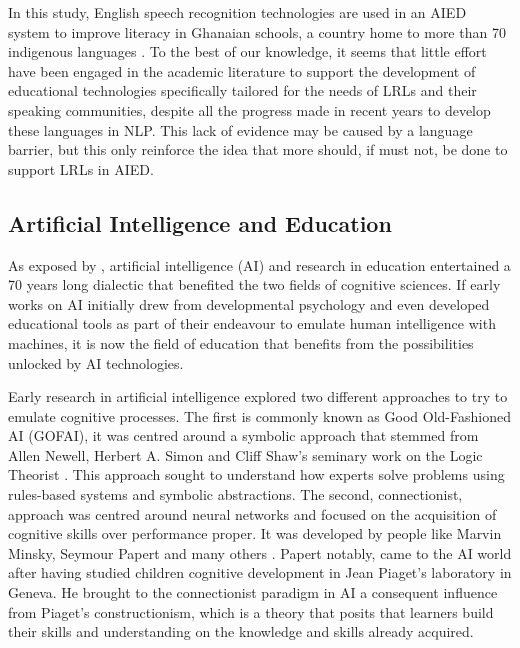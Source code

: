 In this study, English speech recognition technologies are used in an AIED system to improve literacy in Ghanaian schools, a country home to more than 70 indigenous languages \parencite{noauthor_ghana_nodate}.
To the best of our knowledge, it seems that little effort have been engaged in the academic literature to support the development of educational technologies specifically tailored for the needs of LRLs and their speaking communities, despite all the progress made in recent years to develop these languages in NLP. This lack of evidence may be caused by a language barrier, but this only reinforce the idea that more should, if must not, be done to support LRLs in AIED.

    \subsection{Artificial Intelligence and Education}
As exposed by \textcite{doroudi_intertwined_2023}, artificial intelligence (AI) and research in education entertained a 70 years long dialectic that benefited the two fields of cognitive sciences. If early works on AI initially drew from developmental psychology and even developed educational tools as part of their endeavour to emulate human intelligence with machines, it is now the field of education that benefits from the possibilities unlocked by AI technologies.

Early research in artificial intelligence explored two different approaches to try to emulate cognitive processes. The first is commonly known as Good Old-Fashioned AI (GOFAI), it was centred around a symbolic approach that stemmed from Allen Newell, Herbert A. Simon and Cliff Shaw's seminary work on the Logic Theorist \parencite{newell_logic_1956}. This approach sought to understand how experts solve problems using rules-based systems and symbolic abstractions. The second, connectionist, approach was centred around neural networks and focused on the acquisition of cognitive skills over performance proper. It was developed by people like Marvin Minsky, Seymour Papert and many others \parencite{doroudi_intertwined_2023}. Papert notably, came to the AI world after having studied children cognitive development in Jean Piaget's laboratory in Geneva. He brought to the connectionist paradigm in AI a consequent influence from Piaget's constructionism, which is a theory that posits that learners build their skills and understanding on the knowledge and skills already acquired.

